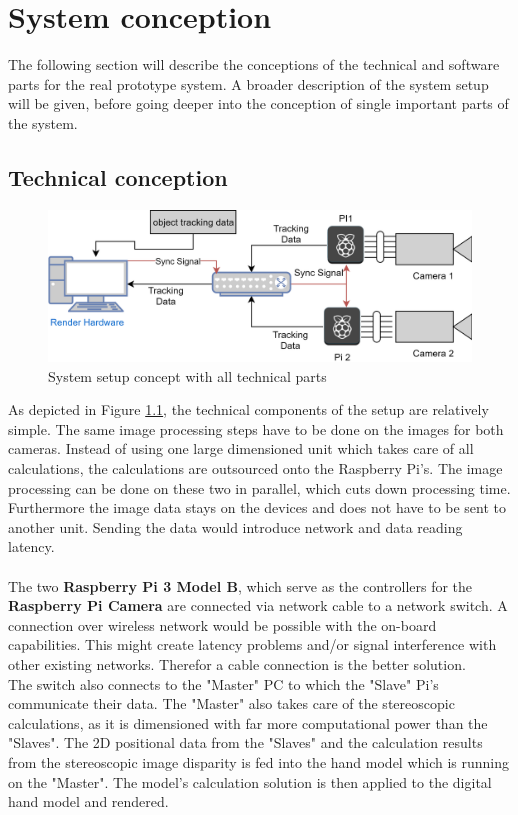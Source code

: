 \chapter{System conception}
The following section will describe the conceptions of the technical and software parts for the real prototype system. A broader description of the system setup will be given, before going deeper into the conception of single important parts of the system.
\section{Technical conception}
\begin{figure}[H]
\includegraphics[width=\textwidth]{images/Technical_Workflow.png}
\caption{System setup concept with all technical parts}
\label{fig:technical-copnception}
\end{figure} 
As depicted in Figure \ref{fig:technical-copnception}, the technical components of the setup are relatively simple. The same image processing steps have to be done on the images for both cameras. Instead of using one large dimensioned unit which takes care of all calculations, the calculations are outsourced onto the Raspberry Pi's. 
The image processing can be done on these two in parallel, which cuts down processing time. Furthermore the image data stays on the devices and does not have to be sent to another unit. Sending the data would introduce network and data reading latency.\\\\
The two \textbf{Raspberry Pi 3 Model B}, which serve as the controllers for the \textbf{Raspberry Pi Camera} are connected via network cable to a network switch. A connection over wireless network would be possible with the on-board capabilities. This might create latency problems and/or signal interference with other existing networks. Therefor a cable connection is the better solution.\\
The switch also connects to the "Master" PC to which the "Slave" Pi's communicate their data. The "Master" also takes care of the stereoscopic calculations, as it is dimensioned with far more computational power than the "Slaves". The 2D positional data from the "Slaves" and the calculation results from the stereoscopic image disparity is fed into the hand model which is running on the "Master". The model's calculation solution is then applied to the digital hand model and rendered.
\newpage

